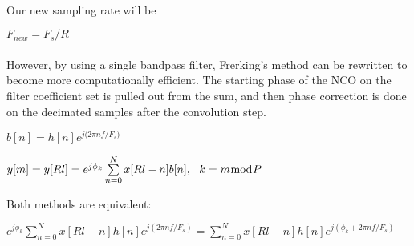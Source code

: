 \documentclass{article}
\begin{document}
        \paragraph{} 
        Our new sampling rate will be
        \begin{center}
            ${F}_{new} = {F}_{s}/R$
        \end{center}
        
        \paragraph{}    
        However, by using a single bandpass filter, Frerking's method can be rewritten to become more computationally efficient. The starting phase of the NCO on the filter coefficient set is pulled out from the sum, and then phase correction is done on the decimated samples after the convolution step.
                
        \begin{center}
            ${{b}[n]} = h[n]e^{j({2{\pi}nf/{F}_s)}} $
        \end{center}

        \begin{center}
            ${y[m]} = {y[Rl]} = e^{j{\phi}_k} \sum\limits_{n=0}^N x[Rl-n]{b[n]},\ \ k = m{\bmod}P $
        \end{center} 
        Both methods are equivalent:
        \begin{center}   
            $e^{j{\phi}_k} \sum\limits_{n=0}^N x[Rl-n]h[n]e^{j(2{\pi}nf/{F}_s)} = \sum\limits_{n=0}^N x[Rl-n]h[n]e^{j({\phi}_k + 2{\pi}nf/{F}_s)} $
        \end{center}
\end{document}
